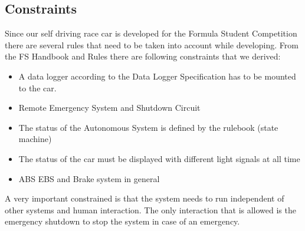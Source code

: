 \documentclass[12pt,a4paper,german]{article}
\begin{document}
    \subsection{Constraints}
    Since our self driving race car is developed for the Formula Student Competition there are several rules that need to be taken into account while developing. From the FS Handbook and Rules there are following constraints that we derived:
    \begin{itemize}
        \item A data logger according to the Data Logger Specification has to be mounted to the car.
        \item Remote Emergency System and Shutdown Circuit
        \item The status of the Autonomous System is defined by the rulebook (state machine)
        \item The status of the car must be displayed with different light signals at all time
        \item ABS EBS and Brake system in general
    \end{itemize}
    A very important constrained is that the system needs to run independent of other systems and human interaction. The only interaction that is allowed is the emergency shutdown to stop the system in case of an emergency.
\end{document}
